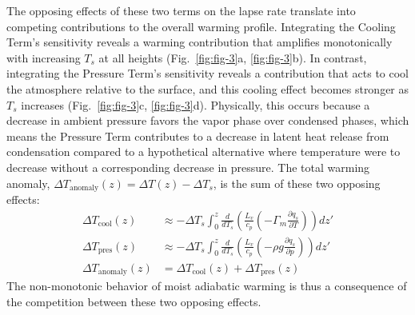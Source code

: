 \documentclass[draft]{ametsocV6.1}
\begin{document}
The opposing effects of these two terms on the lapse rate translate into competing contributions to the overall warming profile. Integrating the Cooling Term's sensitivity reveals a warming contribution that amplifies monotonically with increasing $T_s$ at all heights (Fig.~\ref{fig:fig-3}a, \ref{fig:fig-3}b). In contrast, integrating the Pressure Term's sensitivity reveals a contribution that acts to cool the atmosphere relative to the surface, and this cooling effect becomes stronger as $T_s$ increases (Fig.~\ref{fig:fig-3}c, \ref{fig:fig-3}d). Physically, this occurs because a decrease in ambient pressure favors the vapor phase over condensed phases, which means the Pressure Term contributes to a decrease in latent heat release from condensation compared to a hypothetical alternative where temperature were to decrease without a corresponding decrease in pressure. The total warming anomaly, $\Delta T_{\text{anomaly}}(z)=\Delta T(z)-\Delta T_s$, is the sum of these two opposing effects:
\begin{align}
\Delta T_{\text{cool}}(z) &\approx - \Delta T_s \int_0^z \frac{d}{dT_s}\left(\frac{L_v}{c_p}\left(-\Gamma_m \frac{\partial q_s}{\partial T}\right)\right) dz' \label{eq:delta_t_cool} \\
\Delta T_{\text{pres}}(z) &\approx - \Delta T_s \int_0^z \frac{d}{dT_s}\left(\frac{L_v}{c_p}\left(-\rho g \frac{\partial q_s}{\partial p}\right)\right) dz' \label{eq:delta_t_pres} \\
\Delta T_{\text{anomaly}}(z) &= \Delta T_{\text{cool}}(z) + \Delta T_{\text{pres}}(z) \label{eq:delta_t_anomaly}
\end{align}
The non-monotonic behavior of moist adiabatic warming is thus a consequence of the competition between these two opposing effects.
\end{document}
